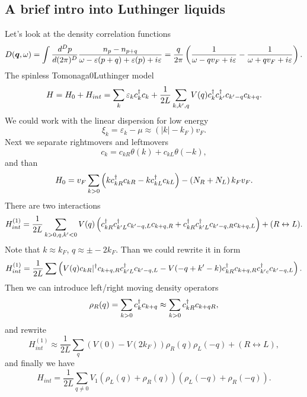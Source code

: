 \subsection*{A brief intro into Luthinger liquids}



Let's look at the density correlation functions
\begin{equation*}
	D(\boldsymbol{q}, \omega) = \int \frac{d^D p}{d (2\pi)^D}
	\frac{n_p - n_{p+q}}{\omega - \varepsilon(p+q) + \varepsilon(p) + i \varepsilon} = 
	\frac{q}{2\pi} \left(
		\frac{1}{\omega - q v_F + i \varepsilon} - \frac{1}{\omega + q v_F + i \varepsilon}
	\right).
\end{equation*}
The spinless Tomonaga0Luthinger model
\begin{equation*}
	H = H_0 + H_{int} = \sum_k \varepsilon_k c^{\dag}_k c_k + \frac{1}{2L} \sum_{k,k',q} V(q) c_k^{\dag} c_{k'}^{\dag} c_{k'-q} c_{k+q}.
\end{equation*}
We could work with the linear dispersion for low energy
\begin{equation*}
	\xi_k = \varepsilon_k - \mu \approx (|k|-k_F) v_F.
\end{equation*}
Next we separate rightmovers and leftmovers
\begin{equation*}
	c_k = c_{kR} \theta(k) + c_{kL} \theta(-k),
\end{equation*}
and than
\begin{equation*}
	H_0 = v_F \sum_{k > 0} \left(
		k c_{kR}^{\dag} c_{kR} - k c_{kL}^{\dag} c_{kL}
	\right) - \left(N_R+N_L\right) k_F v_F.
\end{equation*}
There are two interactions
\begin{equation*}
	H_{int}^{(1)} = \frac{1}{2L} \sum_{k > 0, q, k' < 0} V(q) \left(
		c_{kR}^{\dag} c_{k'L}^{\dag} c_{k'-q,L} c_{k+q,R} + c_{kR}^{\dag} c_{k'L}^{\dag} c_{k'-q,R} c_{k+q,L}
	\right) + (R \leftrightarrow L).
\end{equation*}
Note that $k \approx k_F$, $q \approx \pm-2k_F$. 
Than we could rewrite it in form
\begin{equation*}
	H_{int}^{(1)} = \frac{1}{2L} \sum \left(
		V(q) c_{kR}|^{\dag} c_{k+q,R} c^{\dag}_{k' L} c_{k'-q,L} - V(-q + k'-k) c^{\dag}_{kR} c_{k+q,R} c^{\dag}_{k'c} c_{k'-q,L}
	\right).
\end{equation*}
Then we can introduce left/right moving density operators
\begin{equation*}
	\rho_R(q) = \sum_{k>0} c_k^{\dag} c_{k+q} \approx \sum_{k>0} c^{\dag}_{kR} c_{k+qR},
\end{equation*}
and rewrite
\begin{equation*}
	H_{int}^{(1)} \approx \frac{1}{2L} \sum_q \left(
		V(0) - V(2 k_F)
	\right) \rho_R(q) \rho_L(-q) + (R \leftrightarrow L),
\end{equation*}
and finally we have
\begin{equation*}
	H_{int} = \frac{1}{2L} \sum_{q \neq 0} V_1 \left(
		\rho_L (q) + \rho_R(q)
	\right) \left(
		\rho_L(-q) + \rho_R(-q)
	\right).
\end{equation*}

